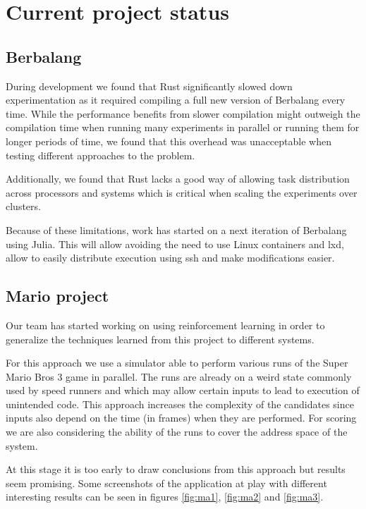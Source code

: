\documentclass{article}
\begin{document}
\clearpage
\section{Current project status}

\subsection{Berbalang}
During development we found that Rust significantly slowed down experimentation as it required compiling a full new version of Berbalang every time. While the performance benefits from slower compilation might outweigh the compilation time when running many experiments in parallel or running them for longer periods of time, we found that this overhead was unacceptable when testing different approaches to the problem.

Additionally, we found that Rust lacks a good way of allowing task distribution across processors and systems which is critical when scaling the experiments over clusters.

Because of these limitations, work has started on a next iteration of Berbalang using Julia. This will allow avoiding the need to use Linux containers and lxd, allow to easily distribute execution using ssh and make modifications easier.

\subsection{Mario project}
Our team has started working on using reinforcement learning in order to generalize the techniques learned from this project to different systems.

For this approach we use a simulator able to perform various runs of the Super Mario Bros 3 game in parallel. The runs are already on a weird state commonly used by speed runners and which may allow certain inputs to lead to execution of unintended code. This approach increases the complexity of the candidates since inputs also depend on the time (in frames) when they are performed. For scoring we are also considering the ability of the runs to cover the address space of the system.

At this stage it is too early to draw conclusions from this approach but results seem promising. Some screenshots of the application at play with different interesting results can be seen in figures \ref{fig:ma1}, \ref{fig:ma2} and \ref{fig:ma3}.
\end{document}
